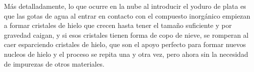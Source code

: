 \documentclass[12pt,a4paper]{article}
\begin{document}

Más detalladamente, lo que ocurre en la nube al introducir el yoduro de plata es que las gotas de agua al entrar en contacto con el compuesto inorgánico empiezan a formar cristales de hielo que crecen hasta tener el tamaño suficiente y por gravedad caigan, y si esos cristales tienen forma de copo de nieve, se romperan al caer esparciendo cristales de hielo, que son el apoyo perfecto para formar nuevos nucleos de hielo y el proceso se repita una y otra vez, pero ahora sin la necesidad de impurezas de otros materiales.
\end{document}
